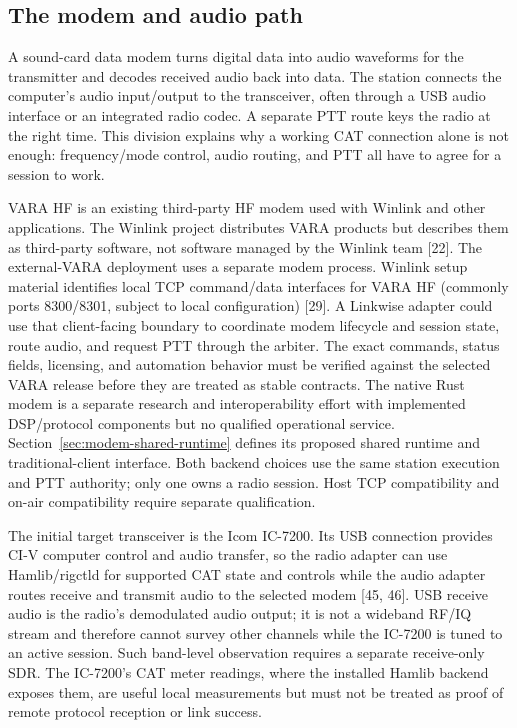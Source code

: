 \documentclass[11pt,a4paper]{article}
\begin{document}
\subsection{The modem and audio path}
A sound-card data modem turns digital data into audio waveforms for the
transmitter and decodes received audio back into data. The station connects
the computer's audio input/output to the transceiver, often through a USB
audio interface or an integrated radio codec. A separate PTT route keys the
radio at the right time. This division explains why a working CAT connection
alone is not enough: frequency/mode control, audio routing, and PTT all have
to agree for a session to work.

VARA HF is an existing third-party HF modem used with Winlink and other
applications. The Winlink project distributes VARA products but describes
them as third-party software, not software managed by the Winlink team [22].
The external-VARA deployment uses a separate modem process. Winlink
setup material identifies local TCP command/data interfaces for VARA HF
(commonly ports 8300/8301, subject to local configuration) [29]. A Linkwise
adapter could use that client-facing boundary to coordinate modem lifecycle
and session state, route audio, and request PTT through the arbiter. The exact
commands, status fields, licensing, and automation behavior must be verified
against the selected VARA release before they are treated as stable
contracts. The native Rust modem is a separate research and interoperability
effort with implemented DSP/protocol components but no qualified operational
service. Section~\ref{sec:modem-shared-runtime} defines its proposed shared
runtime and traditional-client interface. Both backend choices use the same
station execution and PTT authority; only one owns a radio session. Host TCP
compatibility and on-air compatibility require separate qualification.

The initial target transceiver is the Icom IC-7200. Its USB connection
provides CI-V computer control and audio transfer, so the radio adapter can
use Hamlib/rigctld for supported CAT state and controls while the audio
adapter routes receive and transmit audio to the selected modem [45, 46].
USB receive audio is the radio's demodulated audio output; it is not a
wideband RF/IQ stream and therefore cannot survey other channels while the
IC-7200 is tuned to an active session. Such band-level observation requires
a separate receive-only SDR. The IC-7200's CAT meter readings, where the
installed Hamlib backend exposes them, are useful local measurements but
must not be treated as proof of remote protocol reception or link success.
\end{document}
